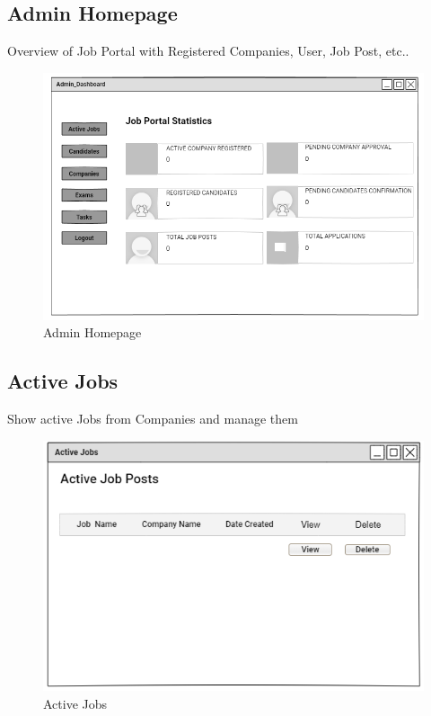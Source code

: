 \documentclass[a4paper,12pt]{report}
\begin{document}
\subsection {Admin Homepage}
Overview of Job Portal with Registered Companies, User, Job Post, etc.. 
\begin{figure}[bph]
	\centering
	\includegraphics[width=1\linewidth]{img/admin/admindash}
	\caption{Admin Homepage}
\end{figure}


\pagebreak

\subsection {Active Jobs}
Show active Jobs from Companies and manage them
\begin{figure}[bph]
	\centering
	\includegraphics[width=.6\linewidth]{img/admin/adminavtvejobs}
	\caption{Active Jobs}
\end{figure}
\end{document}

